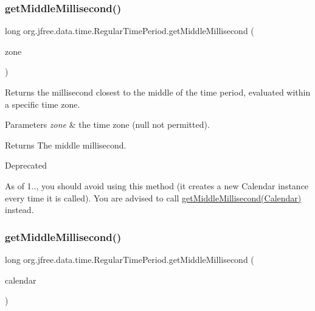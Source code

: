 \subsubsection{\texorpdfstring{get\+Middle\+Millisecond()}{getMiddleMillisecond()}\hspace{0.1cm}{\footnotesize\ttfamily [2/3]}}
{\footnotesize\ttfamily long org.\+jfree.\+data.\+time.\+Regular\+Time\+Period.\+get\+Middle\+Millisecond (\begin{DoxyParamCaption}\item[{Time\+Zone}]{zone }\end{DoxyParamCaption})}

Returns the millisecond closest to the middle of the time period, evaluated within a specific time zone.


\begin{DoxyParams}{Parameters}
{\em zone} & the time zone ({\ttfamily null} not permitted).\\
\hline
\end{DoxyParams}
\begin{DoxyReturn}{Returns}
The middle millisecond.
\end{DoxyReturn}
\begin{DoxyRefDesc}{Deprecated}
\item[\mbox{\hyperlink{deprecated__deprecated000275}{Deprecated}}]As of 1.., you should avoid using this method (it creates a new Calendar instance every time it is called). You are advised to call \mbox{\hyperlink{classorg_1_1jfree_1_1data_1_1time_1_1_regular_time_period_acc6989cf29e1824415f9875f04933d53}{get\+Middle\+Millisecond(\+Calendar)}} instead. \end{DoxyRefDesc}
\mbox{\label{classorg_1_1jfree_1_1data_1_1time_1_1_regular_time_period_acc6989cf29e1824415f9875f04933d53}} 
\subsubsection{\texorpdfstring{get\+Middle\+Millisecond()}{getMiddleMillisecond()}\hspace{0.1cm}{\footnotesize\ttfamily [3/3]}}
{\footnotesize\ttfamily long org.\+jfree.\+data.\+time.\+Regular\+Time\+Period.\+get\+Middle\+Millisecond (\begin{DoxyParamCaption}\item[{Calendar}]{calendar }\end{DoxyParamCaption})}

